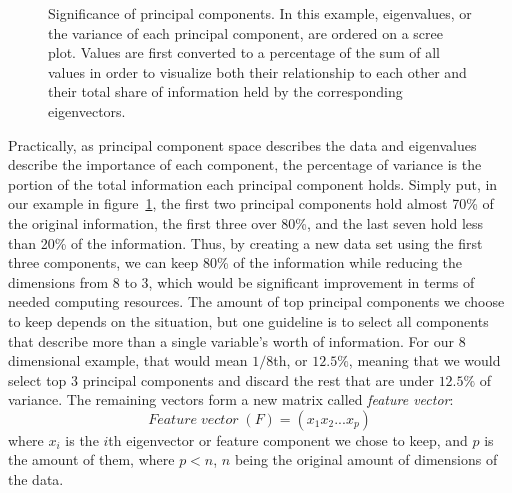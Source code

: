 \begin{figure}[htb]
    \centering
\caption{Significance of principal components.
In this example, eigenvalues, or the variance of each principal component,
    are ordered on a scree plot.
    Values are first converted to a percentage of the sum of all values
    in order to visualize both their relationship to each other
    and their total share of information held by the corresponding eigenvectors.
    \label{fig:pc-variance-values}}
\end{figure}

Practically,
as principal component space describes the data
and eigenvalues describe the importance of each component,
the percentage of variance is the portion of the total information each principal component holds.
Simply put,
in our example in figure~\ref{fig:pc-variance-values},
the first two principal components hold almost 70\% of the original information,
the first three over 80\%,
and the last seven hold less than 20\% of the information.
Thus,
by creating a new data set using the first three components,
we can keep 80\% of the information
while reducing the dimensions from 8 to 3,
which would be significant improvement
in terms of needed computing resources.
The amount of top principal components we choose to keep
depends on the situation,
but one guideline is to select all components
that describe more than a single variable's worth of information.
For our 8 dimensional example,
that would mean $1/8$th, or $12.5\%$,
meaning that we would select top 3 principal components
and discard the rest that are under $12.5\%$ of variance.
The remaining vectors form a new matrix
called \textit{feature vector}:
\begin{equation}
    Feature\; vector\; (F) = (x_{1} x_{2} ... x_{p})
\end{equation}
where $x_{i}$ is the $i$th eigenvector or feature component we chose to keep,
and $p$ is the amount of them, where $p<n$, $n$ being the original amount of dimensions of the data.

